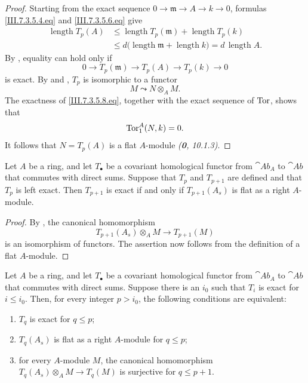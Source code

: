 \begin{proof}
Starting from the exact sequence $0\longrightarrow\mathfrak m\longrightarrow A\longrightarrow k\longrightarrow0$,
formulas \eqref{III.7.3.5.4.eq} and
\eqref{III.7.3.5.6.eq} give
\[
  \begin{split}
  \operatorname{length}T_p(A)
  &\leq
  \operatorname{length}T_p(\mathfrak m)
  +
  \operatorname{length}T_p(k)
  \\
  &\leq
  d\bigl(
    \operatorname{length}\mathfrak m
    +
    \operatorname{length}k
  \bigr)
  =
  d\,\operatorname{length}A.
  \end{split}
\]
By , equality can hold only if
\[
  0\longrightarrow T_p(\mathfrak m)
  \longrightarrow T_p(A)
  \longrightarrow T_p(k)
  \longrightarrow0
  \tag{7.3.5.8}\label{III.7.3.5.8.eq}
\]
is exact.  By  and , $T_p$ is
isomorphic to a functor
\[
  M\leadsto N\otimes_A M.
\]
The exactness of \eqref{III.7.3.5.8.eq}, together with the exact
sequence of $\operatorname{Tor}$, shows that
\[
  \operatorname{Tor}^A_1(N,k)=0.
\]
It follows that $N=T_p(A)$ is a flat $A$-module
\emph{(\textbf{0}, 10.1.3)}.
\end{proof}

\begin{lemma}[7.3.6]
\label{III.7.3.6}
Let $A$ be a ring, and let $T_\bullet$ be a covariant
homological functor from $\cat{Ab}_A$ to $\cat{Ab}$ that
commutes with direct sums.  Suppose that $T_p$ and $T_{p+1}$
are defined and that $T_p$ is left exact.  Then $T_{p+1}$ is
exact if and only if $T_{p+1}(A_s)$ is flat as a right
$A$-module.
\end{lemma}

\begin{proof}
By , the canonical homomorphism
\[
  T_{p+1}(A_s)\otimes_A M
  \longrightarrow
  T_{p+1}(M)
\]
is an isomorphism of functors.  The assertion now follows from
the definition of a flat $A$-module.
\end{proof}

\begin{proposition}[7.3.7]
\label{III.7.3.7}
Let $A$ be a ring, and let $T_\bullet$ be a covariant
homological functor from $\cat{Ab}_A$ to $\cat{Ab}$ that
commutes with direct sums.  Suppose there is an $i_0$ such that
$T_i$ is exact for $i\leq i_0$.  Then, for every integer
$p>i_0$, the following conditions are equivalent:
\begin{enumerate}
  \item[(a)] $T_q$ is exact for $q\leq p$;
  \item[(b)] $T_q(A_s)$ is flat as a right $A$-module for
    $q\leq p$;
  \item[(c)] for every $A$-module $M$, the canonical
    homomorphism $T_q(A_s)\otimes_A M\longrightarrow T_q(M)$
    is surjective for $q\leq p+1$.
\end{enumerate}
\end{proposition}

